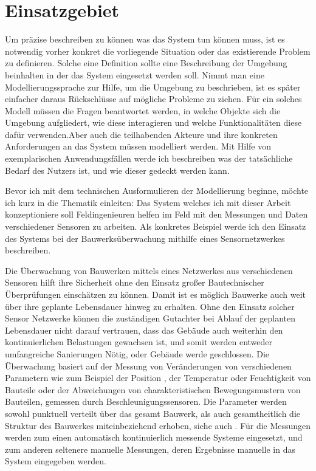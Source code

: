 \section{Einsatzgebiet}
Um präzise beschreiben zu können was das System tun können muss, ist es notwendig vorher konkret die vorliegende Situation oder das existierende Problem zu definieren. Solche eine Definition sollte eine Beschreibung der Umgebung beinhalten in der das System eingesetzt werden soll. Nimmt man eine Modellierungssprache zur Hilfe, um die Umgebung zu beschrieben, ist es später einfacher daraus Rückschlüsse auf mögliche Probleme zu ziehen. Für ein solches Modell müssen die Fragen beantwortet werden, in welche Objekte sich die Umgebung aufgliedert, wie diese interagieren und welche Funktionalitäten diese dafür verwenden.Aber auch die teilhabenden Akteure und ihre konkreten Anforderungen an das System müssen modelliert werden. Mit Hilfe von exemplarischen Anwendungsfällen werde ich beschreiben was der tatsächliche Bedarf des Nutzers ist, und wie dieser gedeckt werden kann.

Bevor ich mit dem technischen Ausformulieren der Modellierung beginne, möchte ich kurz in die Thematik einleiten: Das System welches ich mit dieser Arbeit konzeptioniere soll Feldingenieuren helfen im Feld mit den Messungen und Daten verschiedener Sensoren zu arbeiten. Als konkretes Beispiel werde ich den Einsatz des Systems bei der Bauwerksüberwachung mithilfe eines Sensornetzwerkes beschreiben.

Die Überwachung von Bauwerken mittels eines Netzwerkes aus verschiedenen Sensoren hilft ihre Sicherheit ohne den Einsatz großer Bautechnischer Überprüfungen einschätzen zu können. Damit ist es möglich Bauwerke auch weit über ihre geplante Lebensdauer hinweg zu erhalten. Ohne den Einsatz solcher Sensor Netzwerke können die zuständigen Gutachter bei Ablauf der geplanten Lebensdauer nicht darauf vertrauen, dass das Gebäude auch weiterhin den kontinuierlichen Belastungen gewachsen ist, und somit werden entweder umfangreiche Sanierungen Nötig, oder Gebäude werde geschlossen. Die Überwachung basiert auf der Messung von Veränderungen von verschiedenen Parametern wie zum Beispiel der Position , der Temperatur oder Feuchtigkeit von Bauteile oder der Abweichungen von charakteristischen Bewegungsmustern von Bauteilen, gemessen durch Beschleunigungssensoren. Die Parameter werden sowohl punktuell  verteilt über das gesamt Bauwerk, als auch gesamtheitlich die Struktur des Bauwerkes miteinbeziehend erhoben, siehe auch  \citep{worden_overview_2004} \citep{farrar_introduction_2007} \citep{boller_structural_2004}. Für die Messungen werden zum einen automatisch kontinuierlich messende Systeme eingesetzt, und zum anderen seltenere manuelle Messungen, deren Ergebnisse manuelle in das System eingegeben werden. 

